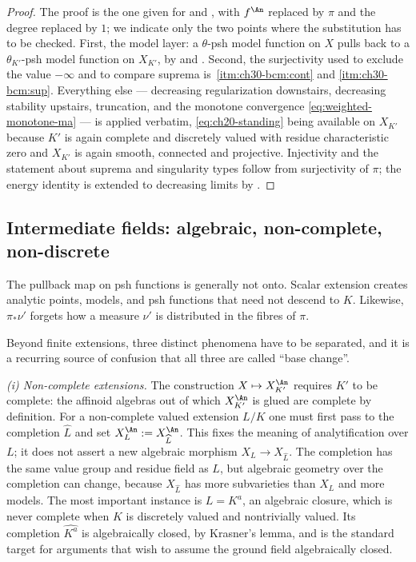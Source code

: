 \begin{proof}
The proof is the one given for  and
, with $f^{\An}$ replaced by
$\pi$ and the degree replaced by $1$; we indicate only the two points
where the substitution has to be checked.  First, the model layer: a
$\theta$-psh model function on $X$ pulls back to a
$\theta_{K'}$-psh model function on $X_{K'}$, by
 and
.  Second, the surjectivity used
to exclude the value $-\infty$ and to compare suprema is
\,\cref{itm:ch30-bcm:cont} and
\cref{itm:ch30-bcm:sup}.  Everything else --- decreasing regularization
downstairs, decreasing stability upstairs, truncation, and the monotone
convergence \eqref{eq:weighted-monotone-ma} --- is applied verbatim,
\eqref{eq:ch20-standing} being available on $X_{K'}$ because $K'$ is
again complete and discretely valued with residue characteristic zero and
$X_{K'}$ is again smooth, connected and projective.  Injectivity and the
statement about suprema and singularity types follow from surjectivity of
$\pi$; the energy identity is
 extended to decreasing limits by
.
\end{proof}

\subsection{Intermediate fields: algebraic, non-complete, non-discrete}
\label{sec:ch30-bc-beyond}

The pullback map on psh functions is generally not onto.  Scalar extension
creates analytic points, models, and psh functions that need not descend to
$K$.  Likewise, $\pi_*\nu'$ forgets how a measure $\nu'$ is
distributed in the fibres of $\pi$.

Beyond finite extensions, three distinct phenomena have to be separated,
and it is a recurring source of confusion that all three are called
``base change''.

\emph{(i) Non-complete extensions.}  The construction $X\mapsto X_{K'}^{\An}$
requires $K'$ to be complete: the affinoid algebras out of which
$X_{K'}^{\An}$ is glued are complete by definition.  For a non-complete
valued extension $L/K$ one must first pass to the completion
$\widehat L$ and set $X_L^{\An}:=X_{\widehat L}^{\An}$.  This fixes the meaning of analytification over $L$; it does not assert
a new algebraic morphism $X_L\to X_{\widehat L}$.  The completion has
the same value group and residue field as $L$, but algebraic geometry
over the completion can change, because
$X_{\widehat L}$ has more subvarieties than $X_L$ and more models.  The
most important instance is $L=K^{a}$, an algebraic closure, which is never
complete when $K$ is discretely valued and nontrivially valued.  Its
completion $\widehat{K^{a}}$ is algebraically closed, by Krasner's lemma,
and is the standard target for arguments that wish to assume the ground
field algebraically closed.

